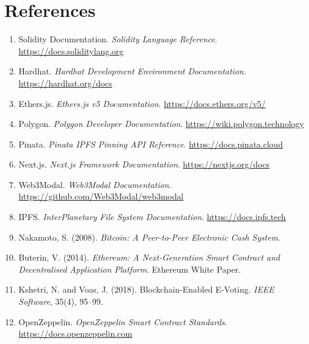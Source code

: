 \documentclass[12pt,a4paper]{report}
\begin{document}
\chapter*{References}

\begin{enumerate}
\item Solidity Documentation. \textit{Solidity Language Reference}. \url{https://docs.soliditylang.org}

\item Hardhat. \textit{Hardhat Development Environment Documentation}. \url{https://hardhat.org/docs}

\item Ethers.js. \textit{Ethers.js v5 Documentation}. \url{https://docs.ethers.org/v5/}

\item Polygon. \textit{Polygon Developer Documentation}. \url{https://wiki.polygon.technology}

\item Pinata. \textit{Pinata IPFS Pinning API Reference}. \url{https://docs.pinata.cloud}

\item Next.js. \textit{Next.js Framework Documentation}. \url{https://nextjs.org/docs}

\item Web3Modal. \textit{Web3Modal Documentation}. \url{https://github.com/Web3Modal/web3modal}

\item IPFS. \textit{InterPlanetary File System Documentation}. \url{https://docs.ipfs.tech}

\item Nakamoto, S. (2008). \textit{Bitcoin: A Peer-to-Peer Electronic Cash System}.

\item Buterin, V. (2014). \textit{Ethereum: A Next-Generation Smart Contract and
      Decentralised Application Platform}. Ethereum White Paper.

\item Kshetri, N. and Voas, J. (2018). Blockchain-Enabled E-Voting.
      \textit{IEEE Software}, 35(4), 95--99.

\item OpenZeppelin. \textit{OpenZeppelin Smart Contract Standards}.
      \url{https://docs.openzeppelin.com}
\end{enumerate}

\end{document}
